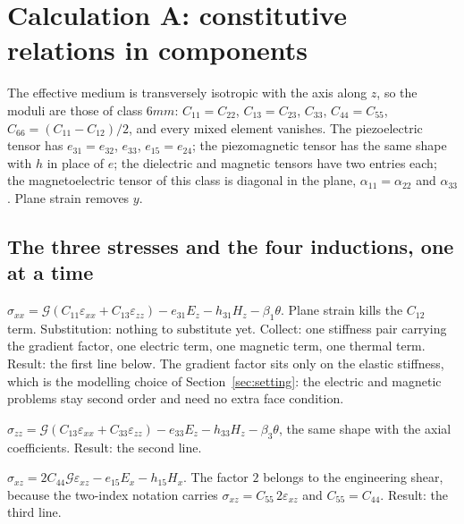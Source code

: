\documentclass[11pt]{article}
\makeatletter
\newif\ifshowworked
\newenvironment{worked}{%
  \ifshowworked\par\smallskip\noindent\textit{Working.}\par\smallskip\else
  \setbox\z@\vbox\bgroup\fi}{\ifshowworked\par\smallskip\else\egroup\fi}
\newcommand{\Gcal}{\mathcal{G}}
\makeatother
\begin{document}
\section{Calculation A: constitutive relations in components}\label{sec:calcA}

\begin{worked}
The effective medium is transversely isotropic with the axis along $z$, so the moduli are those of class
$6mm$: $C_{11}=C_{22}$, $C_{13}=C_{23}$, $C_{33}$, $C_{44}=C_{55}$, $C_{66}=(C_{11}-C_{12})/2$, and every
mixed element vanishes. The piezoelectric tensor has $e_{31}=e_{32}$, $e_{33}$, $e_{15}=e_{24}$; the
piezomagnetic tensor has the same shape with $h$ in place of $e$; the dielectric and magnetic tensors have
two entries each; the magnetoelectric tensor of this class is diagonal in the plane,
$\alpha_{11}=\alpha_{22}$ and $\alpha_{33}$. Plane strain removes $y$.
\end{worked}

\subsection*{The three stresses and the four inductions, one at a time}

\begin{worked}
$\sigma_{xx}=\Gcal(C_{11}\varepsilon_{xx}+C_{13}\varepsilon_{zz})-e_{31}E_z-h_{31}H_z-\beta_1\theta$.
Plane strain kills the $C_{12}$ term. Substitution: nothing to substitute yet. Collect: one stiffness pair
carrying the gradient factor, one electric term, one magnetic term, one thermal term. Result: the first
line below. The gradient factor sits only on the elastic stiffness, which is the modelling choice of
Section~\ref{sec:setting}: the electric and magnetic problems stay second order and need no extra face
condition.
\end{worked}

\begin{worked}
$\sigma_{zz}=\Gcal(C_{13}\varepsilon_{xx}+C_{33}\varepsilon_{zz})-e_{33}E_z-h_{33}H_z-\beta_3\theta$, the
same shape with the axial coefficients. Result: the second line.
\end{worked}

\begin{worked}
$\sigma_{xz}=2C_{44}\Gcal\varepsilon_{xz}-e_{15}E_x-h_{15}H_x$. The factor $2$ belongs to the engineering
shear, because the two-index notation carries $\sigma_{xz}=C_{55}\,2\varepsilon_{xz}$ and $C_{55}=C_{44}$.
Result: the third line.
\end{worked}
\end{document}
